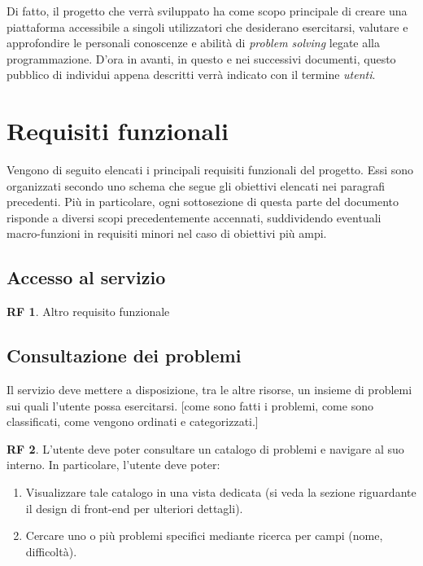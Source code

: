 \documentclass[11pt, a4paper]{article}
\theoremstyle{definition}
\newtheorem{funcreq}{RF} %
\begin{document}
Di fatto, il progetto che verrà sviluppato ha come scopo principale di
creare una piattaforma accessibile a singoli utilizzatori che desiderano
esercitarsi, valutare e approfondire le personali conoscenze e abilità di
\textit{problem solving} legate alla programmazione.
D'ora in avanti, in questo e nei successivi documenti, questo pubblico di
individui appena descritti verrà indicato con il termine \textit{utenti}.

\newpage
\section{Requisiti funzionali}
Vengono di seguito elencati i principali requisiti funzionali del progetto.
Essi sono organizzati secondo uno schema che segue gli obiettivi elencati nei
paragrafi precedenti. Più in particolare, ogni sottosezione di questa parte
del documento risponde a diversi scopi precedentemente accennati, suddividendo
eventuali macro-funzioni in requisiti minori nel caso di obiettivi più ampi.

\subsection*{Accesso al servizio}

\begin{funcreq}
Altro requisito funzionale
\end{funcreq}


\subsection*{Consultazione dei problemi}
Il servizio deve mettere a disposizione, tra le altre risorse, un insieme di problemi sui quali l'utente possa esercitarsi. [come sono fatti i problemi,
come sono classificati, come vengono ordinati e categorizzati.]

\begin{funcreq}
L'utente deve poter consultare un catalogo di problemi e navigare al suo
interno. In particolare, l'utente deve poter:
\begin{enumerate}
    \item Visualizzare tale catalogo in una vista dedicata (si veda la
    sezione riguardante il design di front-end per ulteriori dettagli).
    \item Cercare uno o più problemi specifici mediante ricerca per campi (nome,
    difficoltà).
\end{enumerate}
\end{funcreq}
\end{document}
